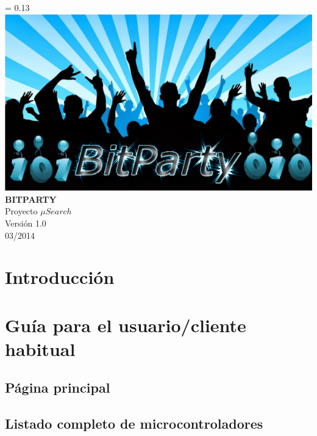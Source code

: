 \documentclass[11pt,spanish]{article}
\renewenvironment{abstract}
 {\small
  \begin{center}
  \bfseries \abstractname\vspace{-.5em}\vspace{0pt}
  \end{center}
  \list{}{%
    \setlength{\leftmargin}{7.5mm}%
    \setlength{\rightmargin}{\leftmargin}%
  }%
  \item\relax}
 {\endlist}
\renewcommand{\thepage}{\roman{page}}
\newcommand{\nombreDelProyecto}{$\mu Search$}
\newcommand{\singlelinebreak}{\\[\baselineskip]}
\newcommand{\multiplelinebreak}[1]{\\[#1\baselineskip]}
\newlength{\drop}
\newcommand*{\titulo}{\begingroup
\thispagestyle{empty}
\drop = 0.13\textheight
\centering
\vfill
\vspace*{\drop}
\includegraphics[scale=0.25]{img/bitparty_big}\singlelinebreak
{\Huge\bf BITPARTY}\multiplelinebreak{2}
{\huge Proyecto \nombreDelProyecto}\multiplelinebreak{2}
{\Large Versión  1.0}\multiplelinebreak{1}
{\Large 03/2014}
\vfill
\vspace*{\drop}
\endgroup}
\begin{document}
\titulo
\clearpage



%


\newpage


\tableofcontents
\clearpage


\renewcommand{\thepage}{\arabic{page}}

\section{Introducción}


\newpage
\section{Guía para el usuario/cliente habitual}


\subsection{Página principal}


\subsection{Listado completo de microcontroladores}

\end{document}
